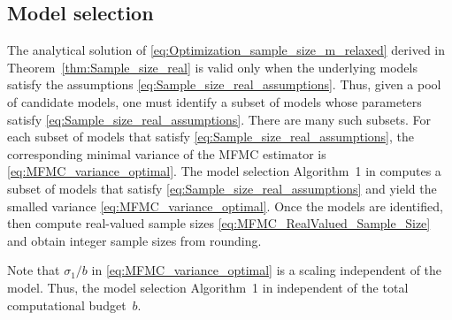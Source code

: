 \subsection{Model selection}
The analytical solution of \eqref{eq:Optimization_sample_size_m_relaxed} derived in Theorem~\ref{thm:Sample_size_real} is valid only when the underlying models satisfy the assumptions  \eqref{eq:Sample_size_real_assumptions}. 
Thus, given a pool of candidate models, one must identify a subset of models whose parameters satisfy 
 \eqref{eq:Sample_size_real_assumptions}. There are many such subsets.
 For each subset of models that satisfy \eqref{eq:Sample_size_real_assumptions}, the corresponding
 minimal variance of the MFMC estimator is \eqref{eq:MFMC_variance_optimal}.
 The model selection Algorithm~1 in \cite{BPeherstorfer_KWillcox_MDGunzburger_2016a} computes
 a subset of models that satisfy  \eqref{eq:Sample_size_real_assumptions} and yield the smalled 
 variance  \eqref{eq:MFMC_variance_optimal}.
 Once the models are identified, then \cite{BPeherstorfer_KWillcox_MDGunzburger_2016a} compute 
 real-valued sample sizes \eqref{eq:MFMC_RealValued_Sample_Size} and obtain integer sample
 sizes from rounding.
 
 Note that $\sigma_1/b$ in  \eqref{eq:MFMC_variance_optimal} is a scaling independent of the 
 model. Thus,  the model selection Algorithm~1 in \cite{BPeherstorfer_KWillcox_MDGunzburger_2016a} 
 independent of the total computational budget~$b$.





    
